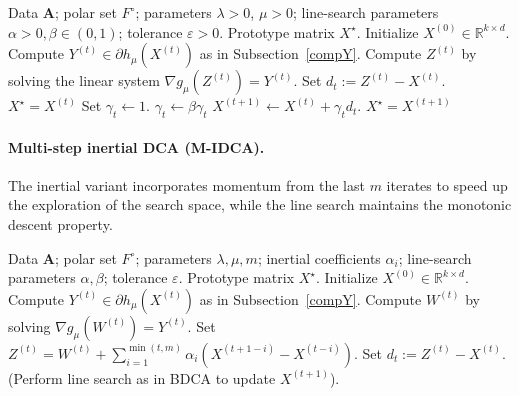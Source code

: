 \documentclass[11pt]{article}
\theoremstyle{definition}
\newcommand{\1}{\mathbf{1}}
\begin{document}
\begin{algorithm}[H]
\caption{BDCA for the smoothed Minkowski clustering model}
\label{alg:BDCA}
\begin{algorithmic}[1]
\Require Data $\mathbf{A}$; polar set $F^\circ$; parameters $\lambda>0$, $\mu>0$; line-search parameters $\alpha>0, \beta \in (0,1)$; tolerance $\varepsilon>0$.
\Ensure Prototype matrix $X^\star$.
\State Initialize $X^{(0)} \in \mathbb{R}^{k \times d}$.
    \State Compute $Y^{(t)} \in \partial h_\mu(X^{(t)})$ as in Subsection~\ref{compY}.
    \State Compute $Z^{(t)}$ by solving the linear system $\nabla g_\mu(Z^{(t)}) = Y^{(t)}$.
    \State Set $d_t := Z^{(t)} - X^{(t)}$.
     \State \Return $X^\star = X^{(t)}$ \EndIf
    \State Set $\gamma_t \gets 1$. 
        \State $\gamma_t \gets \beta \gamma_t$
    \EndWhile
    \State $X^{(t+1)} \gets X^{(t)} + \gamma_t d_t$.
     \State \Return $X^\star = X^{(t+1)}$ \EndIf
\EndFor
\end{algorithmic}
\end{algorithm}

\paragraph{Multi-step inertial DCA (M-IDCA).}
The inertial variant incorporates momentum from the last $m$ iterates to speed up the exploration of the search space, while the line search maintains the monotonic descent property.

\begin{algorithm}[H]
\caption{Multi-step inertial DCA (M-IDCA)}
\label{alg:BM-M-IDCA}
\begin{algorithmic}[1]
\Require Data $\mathbf{A}$; polar set $F^\circ$; parameters $\lambda, \mu, m$; inertial coefficients $\alpha_i$; line-search parameters $\alpha, \beta$; tolerance $\varepsilon$.
\Ensure Prototype matrix $X^\star$.
\State Initialize $X^{(0)} \in \mathbb{R}^{k \times d}$.
    \State Compute $Y^{(t)} \in \partial h_\mu(X^{(t)})$ as in Subsection~\ref{compY}.
    \State Compute $W^{(t)}$ by solving $\nabla g_\mu(W^{(t)}) = Y^{(t)}$. 
    \State Set $Z^{(t)} = W^{(t)} + \sum_{i=1}^{\min(t,m)} \alpha_i ( X^{(t+1-i)} - X^{(t-i)} )$. 
    \State Set $d_t := Z^{(t)} - X^{(t)}$.
    \State (Perform line search as in BDCA to update $X^{(t+1)}$).
\EndFor
\end{algorithmic}
\end{algorithm}
\end{document}
